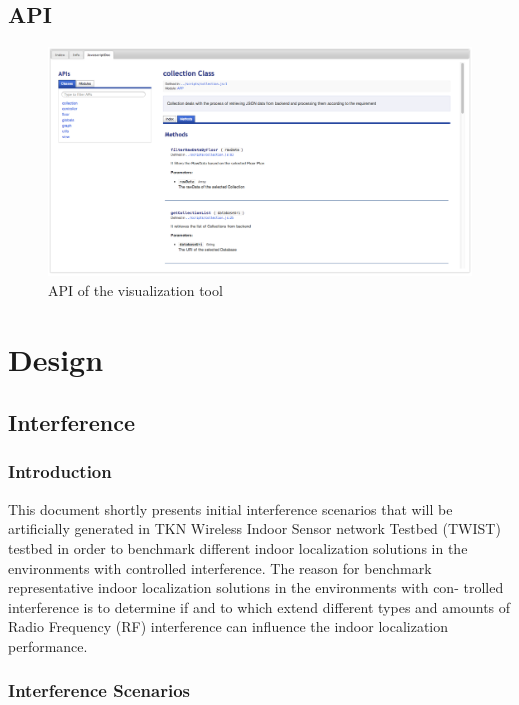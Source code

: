 \documentclass[11pt,a4paper,headinclude,footinclude,chapterprefix=on]{scrreprt}
\begin{document}
\section{API} 
\begin{figure}
	[!] \centering 
	\includegraphics[width=15cm]{Images/tool_jsDoc.png} \caption{API of the visualization tool} \label{fig:tool:jsDoc} 
\end{figure}

\chapter{Design} 
\section{Interference} 
\subsection{Introduction} This document shortly presents initial interference scenarios that will be artificially generated in TKN Wireless Indoor Sensor network Testbed (TWIST) testbed in order to benchmark different indoor localization solutions in the environments with controlled interference. The reason for benchmark representative indoor localization solutions in the environments with con- trolled interference is to determine if and to which extend different types and amounts of Radio Frequency (RF) interference can influence the indoor localization performance. 
\subsection{Interference Scenarios}
\end{document}
